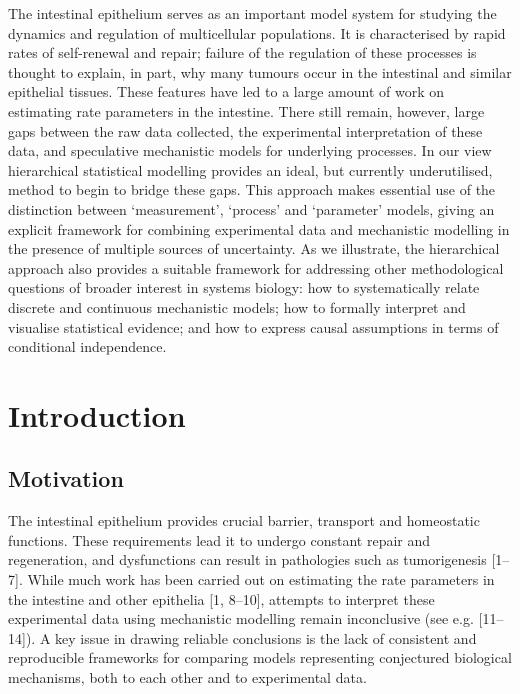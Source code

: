 \documentclass[10pt,letterpaper]{article}
\begin{document}
The intestinal epithelium serves as an important model system for
studying the dynamics and regulation of multicellular populations. It is
characterised by rapid rates of self-renewal and repair; failure of the
regulation of these processes is thought to explain, in part, why many
tumours occur in the intestinal and similar epithelial tissues. These
features have led to a large amount of work on estimating rate
parameters in the intestine. There still remain, however, large gaps
between the raw data collected, the experimental interpretation of these
data, and speculative mechanistic models for underlying processes. In
our view hierarchical statistical modelling provides an ideal, but
currently underutilised, method to begin to bridge these gaps. This
approach makes essential use of the distinction between `measurement',
`process' and `parameter' models, giving an explicit framework for
combining experimental data and mechanistic modelling in the presence of
multiple sources of uncertainty. As we illustrate, the hierarchical
approach also provides a suitable framework for addressing other
methodological questions of broader interest in systems biology: how to
systematically relate discrete and continuous mechanistic models; how to
formally interpret and visualise statistical evidence; and how to
express causal assumptions in terms of conditional independence.

\linenumbers

\section{Introduction}\label{introduction}

\subsection{Motivation}\label{motivation}

The intestinal epithelium provides crucial barrier, transport and
homeostatic functions. These requirements lead it to undergo constant
repair and regeneration, and dysfunctions can result in pathologies such
as tumorigenesis {[}1--7{]}. While much work has been carried out on
estimating the rate parameters in the intestine and other epithelia
{[}1, 8--10{]}, attempts to interpret these experimental data using
mechanistic modelling remain inconclusive (see e.g. {[}11--14{]}). A key
issue in drawing reliable conclusions is the lack of consistent and
reproducible frameworks for comparing models representing conjectured
biological mechanisms, both to each other and to experimental data.
\end{document}
